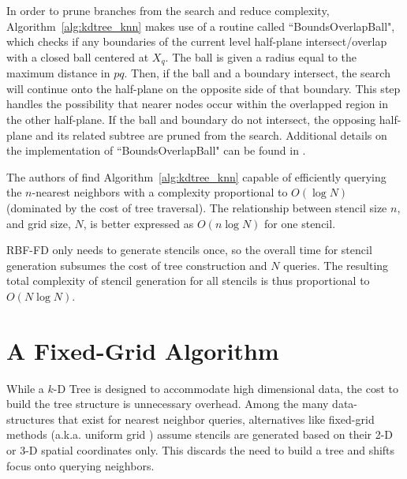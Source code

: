 \documentclass{report}
\begin{document}
In order to prune branches from the search and reduce complexity, Algorithm~\ref{alg:kdtree_knn} makes use of a routine called ``BoundsOverlapBall", which checks if any boundaries of the current level half-plane intersect/overlap with a closed ball centered at $X_q$. The ball is given a radius equal to the maximum distance in $pq$. Then, if the ball and a boundary intersect, the search will continue onto the half-plane on the opposite side of that boundary. This step handles the possibility that nearer nodes occur within the overlapped region in the other half-plane. If the ball and boundary do not intersect, the opposing half-plane and its related subtree are pruned from the search. Additional details on the implementation of ``BoundsOverlapBall" can be found in \cite{Friedman1977,TagliasacchiGC}. 

The authors of \cite{Friedman1977} find Algorithm~\ref{alg:kdtree_knn} capable of efficiently querying the $n$-nearest neighbors with a complexity proportional to $O(\log{N})$ (dominated by the cost of tree traversal). The relationship between stencil size $n$, and grid size, $N$, is better expressed as $O(n \log{N})$ for one stencil. 

RBF-FD only needs to generate stencils once, so the overall time for stencil generation subsumes the cost of tree construction and $N$ queries. The resulting total complexity of stencil generation for all stencils is thus proportional to $O(N\log{N})$. %





\section{A Fixed-Grid Algorithm}

While a $k$-D Tree is designed to accommodate high dimensional data, the cost to build the tree structure is unnecessary overhead. Among the many data-structures that exist for nearest neighbor queries, alternatives like fixed-grid methods \cite{Samet2005,Wendland2002,WendlandBook} (a.k.a. uniform grid \cite{Krog2010,Green2010}) assume stencils are generated based on their 2-D or 3-D spatial coordinates only. This discards the need to build a tree and shifts focus onto querying neighbors.
\end{document}
